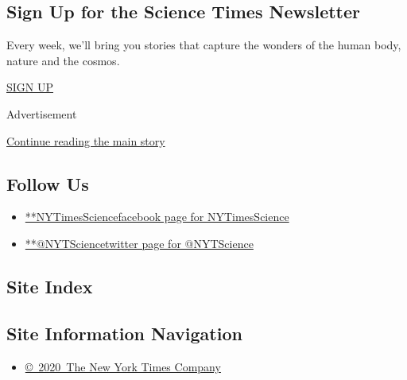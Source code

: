 \hypertarget{sign-up-for-the-science-times-newsletter}{%
\subsection{Sign Up for the Science Times
Newsletter}\label{sign-up-for-the-science-times-newsletter}}

Every week, we'll bring you stories that capture the wonders of the
human body, nature and the cosmos.

\href{/newsletters/signup/SC}{SIGN UP}

Advertisement

\protect\hyperlink{after-mktg}{Continue reading the main story}

\hypertarget{follow-us}{%
\subsection{Follow Us}\label{follow-us}}

\begin{itemize}
\tightlist
\item
  \href{https://www.facebookcorewwwi.onion/NYTimesScience}{**NYTimesSciencefacebook
  page for NYTimesScience}
\item
  \href{https://twitter.com/NYTScience}{**@NYTSciencetwitter page for
  @NYTScience}
\end{itemize}

\hypertarget{site-index}{%
\subsection{Site Index}\label{site-index}}

\hypertarget{site-information-navigation}{%
\subsection{Site Information
Navigation}\label{site-information-navigation}}

\begin{itemize}
\tightlist
\item
  \href{https://help.nytimes3xbfgragh.onion/hc/en-us/articles/115014792127-Copyright-notice}{©~2020~The
  New York Times Company}
\end{itemize}

